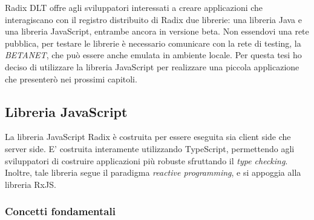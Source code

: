Radix DLT offre agli sviluppatori interessati a creare applicazioni che interagiscano con il registro distribuito di Radix due librerie: una libreria Java e una libreria JavaScript, entrambe ancora in versione beta. Non essendovi una rete pubblica, per testare le librerie è necessario comunicare con la rete di testing, la \textit{BETANET}, che può essere anche emulata in ambiente locale. Per questa tesi ho deciso di utilizzare la libreria JavaScript per realizzare una piccola applicazione che presenterò nei prossimi capitoli.

\subsection{Libreria JavaScript}

La libreria JavaScript Radix è costruita per essere eseguita sia client side che server side. E' costruita interamente utilizzando TypeScript, permettendo agli sviluppatori di costruire applicazioni più robuste sfruttando il \textit{type checking}. Inoltre, tale libreria segue il paradigma \textit{reactive programming}, e si appoggia alla libreria RxJS.

\subsubsection{Concetti fondamentali}


